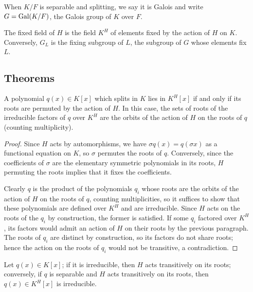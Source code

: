 \begin{definition} When $K/F$ is separable and splitting, we say it is Galois and
write $G = \operatorname{\text{Gal}}(K/F)$, the Galois group of $K$ over $F$.
\label{defn:galois_extension}
\end{definition}

\begin{definition} The fixed field of $H$ is the field $K^H$ of elements fixed by
the action of $H$ on $K$.  Conversely, $G_L$ is the fixing subgroup of $L$,
the subgroup of $G$ whose elements fix $L$.
\label{defn:fixing}
\end{definition}

\subsection{Theorems}

\begin{lemma} A polynomial $q(x) \in K[x]$ which splits in $K$ lies in
$K^H[x]$ if and only if its roots are permuted by the action of $H$.  In this
case, the sets of roots of the irreducible factors of $q$ over $K^H$ are the orbits
of the action of $H$ on the roots of $q$ (counting multiplicity).
\label{root_action}
\end{lemma}

\begin{proof} Since $H$ acts by automorphisms, we have $\sigma q(x) = q(\sigma
x)$ as a functional equation on $K$, so $\sigma$ permutes the roots of $q$.
Conversely, since the coefficients of $\sigma$ are the elementary symmetric
polynomials in its roots, $H$ permuting the roots implies that it fixes the
coefficients.

Clearly $q$ is the product of the polynomials $q_i$ whose roots are the orbits
of the action of $H$ on the roots of $q$, counting multiplicities, so it
suffices to show that these polynomials are defined over $K^H$ and are
irreducible.  Since $H$ acts on the roots of the $q_i$ by construction, the
former is satisfied.  If some $q_i$ factored over $K^H$, its factors would
admit an action of $H$ on their roots by the previous paragraph.  The roots of
$q_i$ are distinct by construction, so its factors do not share roots; hence
the action on the roots of $q_i$ would not be transitive, a contradiction.
\end{proof}

\begin{corollary} Let $q(x) \in K[x]$; if it is irreducible, then $H$ acts
transitively on its roots; conversely, if $q$ is separable and $H$ acts
transitively on its roots, then $q(x) \in K^H[x]$ is irreducible.
\label{sep_irred}
\end{corollary}

